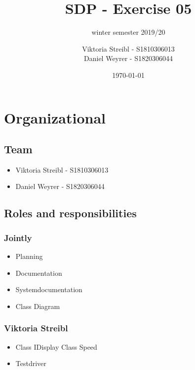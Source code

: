 

\graphicspath{{./}}



\title{SDP - Exercise 05} %
\subtitle{winter semester 2019/20} %
\author{
Viktoria Streibl - S1810306013\\
  Daniel Weyrer - S1820306044
} %
\date{\today} %

\maketitle %

\newpage
\tableofcontents %
\newpage


\section{Organizational}
\subsection{Team}
\begin{itemize}
	\item Viktoria 	Streibl 		- 	S1810306013
	\item Daniel 	Weyrer		-	S1820306044
\end{itemize}

\subsection{Roles and responsibilities}
\subsubsection{Jointly}
\begin{itemize}
	\item Planning
	\item Documentation
	\item Systemdocumentation
	\item Class Diagram
\end{itemize}

\subsubsection{Viktoria Streibl}
\begin{itemize}
	\item Class IDisplay
	\subitem Class Speed
	\item Testdriver
\end{itemize}

